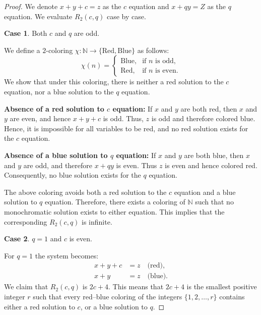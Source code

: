 \documentclass[preprint,12pt]{elsarticle}
\theoremstyle{plain}
\theoremstyle{definition}
\newtheorem{case}{Case}
\begin{document}
\begin{proof} We denote $x+y+c =z$ as the $c$ equation and $x+qy=Z$ as the $q$ equation. We evaluate $R_2(c,q)$ case by case.
\begin{case}
    Both $c$ and $q$ are odd.
\end{case}
We define a $2$-coloring $\chi : \mathbb{N} \longrightarrow \{\text{Red}, \text{Blue}\}$ as follows:
$$
\chi(n) =
\begin{cases}
\text{Blue}, & \text{if } n \text{ is odd}, \\
\text{Red},  & \text{if } n \text{ is even}.
\end{cases}
$$
We show that under this coloring, there is neither a red solution to the $c$ equation, nor a blue solution to the $q$ equation.

\medskip

\noindent
\textbf{Absence of a red solution to $c$ equation:}
 If $x$ and $y$ are both red, then $x$ and $y$ are even, and hence $x + y + c$ is odd. Thus, $z$ is odd and therefore colored blue. Hence, it is impossible for all variables to be red, and no red solution exists for the $c$ equation.

\medskip

\noindent
\textbf{Absence of a blue solution to $q$ equation:}  
 If $x$ and $y$ are both blue, then $x$ and $y$ are odd, and therefore $x + qy$ is even. Thus $z$ is even and hence colored red. Consequently, no blue solution exists for the $q$ equation.

\medskip

\noindent

The above coloring avoids both a red solution to the $c$ equation and a blue solution to $q$ equation. Therefore, there exists a coloring of $\mathbb{N}$ such that no monochromatic solution exists to either equation. This implies that the corresponding $R_2(c,q)$ is infinite.

\begin{case}
    $q=1$ and $c$ is even.
\end{case}
For $q=1$ the system becomes:
\begin{align*}
x+y+c &= z \quad \text{(red)},\\
x+y  &= z \quad \text{(blue).}
\end{align*}
We claim that $R_2(c,q)$ is \(2c+4\). This means that $2c+4$ is the smallest positive integer \(r\) such that every red--blue coloring of the integers \(\{1,2,\dots,r\}\) contains either a red solution to $c$, or a blue solution to $q$.


\end{proof}
\end{document}
